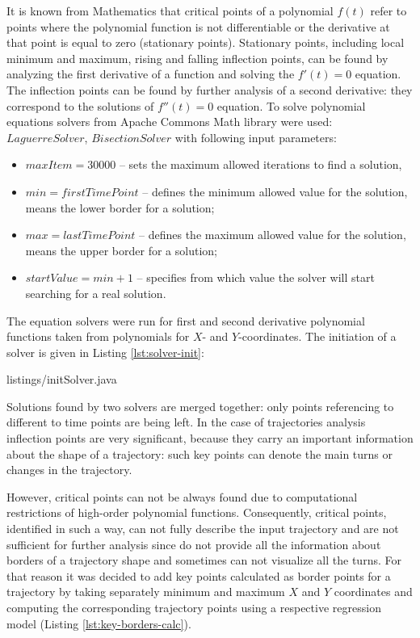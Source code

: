It is known from Mathematics that critical points of a polynomial $f(t)$ refer to points where the polynomial function is not differentiable or the derivative at that point is equal to zero (stationary points). Stationary points, including local minimum and maximum, rising and falling inflection points, can be found by analyzing the first derivative of a function and solving the $f'(t) = 0$ equation. The inflection points can be found by further analysis of a second derivative: they correspond to the solutions of $f''(t) = 0$ equation. To solve polynomial equations solvers from Apache Commons Math library were used: $LaguerreSolver$, $BisectionSolver$ with following input parameters:
\begin{itemize}
	\item $maxItem = 30000$ -- sets the maximum allowed iterations to find a solution,
	\item $min = firstTimePoint$ -- defines the minimum allowed value for the solution, means the lower border for a solution;
	\item $max = lastTimePoint$ -- defines the maximum allowed value for the solution, means the upper border for a solution;
	\item $startValue = min + 1$ -- specifies from which value the solver will start searching for a real solution.
\end{itemize}

The equation solvers were run for first and second derivative polynomial functions taken from polynomials for $X$- and $Y$-coordinates. The initiation of a solver is given in Listing \ref{lst:solver-init}:

 {listings/initSolver.java}

Solutions found by two solvers are merged together: only points referencing to different to time points are being left.
In the case of trajectories analysis inflection points are very significant, because they carry an important information about the shape of a trajectory: such key points can denote the main turns or changes in the trajectory.

However, critical points can not be always found due to computational restrictions of high-order polynomial functions. Consequently, critical points, identified in such a way, can not fully describe the input trajectory and are not sufficient for further analysis since do not provide all the information about borders of a trajectory shape and sometimes can not visualize all the turns. For that reason it was decided to add key points calculated as border points for a trajectory by taking separately minimum and maximum $X$ and $Y$ coordinates and computing the corresponding trajectory points using a respective regression model (Listing \ref{lst:key-borders-calc}).

